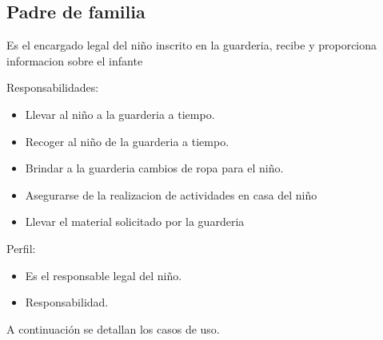 \begin{Usuario}{\hypertarget{padre}{\subsection{Padre de familia}}}{
	Es el encargado legal del niño inscrito en la guarderia, recibe y proporciona informacion sobre el infante
}
    \item[Responsabilidades:] \cdtEmpty
    \begin{itemize}
		\item Llevar al niño a la guarderia a tiempo.
		\item Recoger al niño de la guarderia a tiempo.
		\item Brindar a la guarderia cambios de ropa para el niño.
            \item Asegurarse de la realizacion de actividades en casa del niño
            \item Llevar el material solicitado por la guarderia
    \end{itemize}

	\item[Perfil:] \cdtEmpty
    \begin{itemize}
		\item Es el responsable legal del niño.
		\item Responsabilidad.
    \end{itemize}
\end{Usuario}

A continuación se detallan los casos de uso.



















